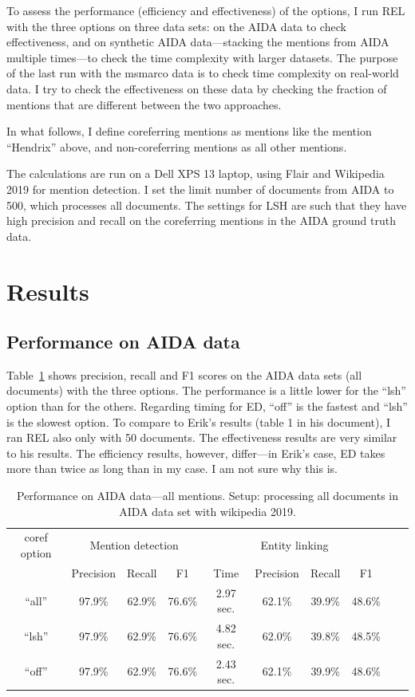 \documentclass[a4paper,11pt]{article}
\numberwithin{equation}{section} %
\begin{document}
To assess the performance (efficiency and effectiveness) of the options, I run REL with the three options on three data sets: on the AIDA data to check effectiveness, and on synthetic AIDA data---stacking the mentions from AIDA multiple times---to check the time complexity with larger datasets. The purpose of the last run with the msmarco data is to check time complexity on real-world data. I try to check the effectiveness on these data by checking the fraction of mentions that are different between the two approaches. 

In what follows, I define coreferring mentions as mentions like the mention ``Hendrix'' above, and non-coreferring mentions as all other mentions.

The calculations are run on a Dell XPS 13 laptop, using Flair and Wikipedia 2019 for mention detection. I set the limit number of documents from AIDA to 500, which processes all documents. 
The settings for LSH are such that they have high precision and recall on the coreferring mentions in the AIDA ground truth data. 





\section{Results}

\subsection{Performance on AIDA data}

Table~\ref{tab:performance_aida_full} shows precision, recall and F1 scores on the AIDA data sets (all documents) with the three options. The performance is a little lower for the ``lsh'' option than for the others. Regarding timing for ED, ``off'' is the fastest and ``lsh'' is the slowest option. 
To compare to Erik's results (table 1 in his document), I ran REL also only with 50 documents. The effectiveness results are very similar to his results. The efficiency results, however, differ---in Erik's case, ED takes more than twice as long than in my case. I am not sure why this is.

\begin{table}
 \begin{tabular}{c c c c c c c c c c}
\hline
 coref option & \multicolumn{3}{c}{Mention detection} & \multicolumn{4}{c}{Entity linking}  \\
        & Precision & Recall & F1 & Time & Precision & Recall & F1 \\
 \hline 
 ``all'' & 97.9\% & 62.9\% & 76.6\% & 2.97 sec. & 62.1\% & 39.9\% & 48.6\% \\  
 ``lsh'' & 97.9\% & 62.9\% & 76.6\% & 4.82 sec. & 62.0\% & 39.8\% & 48.5\% \\
 ``off'' & 97.9\% & 62.9\% & 76.6\% & 2.43 sec.  & 62.1\% & 39.9\% & 48.6\% \\ 
\hline 
\end{tabular}
\caption{Performance on AIDA data---all mentions. Setup: processing all documents in AIDA data set with wikipedia 2019.}
\label{tab:performance_aida_full}
\end{table}
\end{document}
